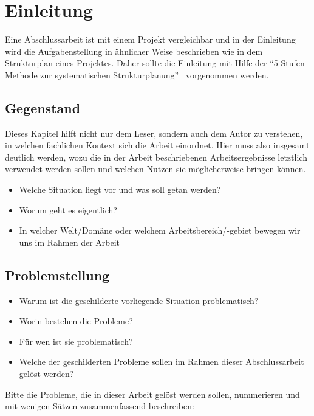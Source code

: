\chapter{Einleitung}\label{ch:introduction}
Eine Abschlussarbeit ist mit einem Projekt vergleichbar und in der Einleitung wird die Aufgabenstellung in ähnlicher Weise beschrieben wie in dem Strukturplan eines Projektes.
Daher sollte die Einleitung mit Hilfe der \enquote{5-Stufen-Methode zur systematischen Strukturplanung}~\citep{ob}\footnotemark{} vorgenommen werden.

\section{Gegenstand}
Dieses Kapitel hilft nicht nur dem Leser, sondern auch dem Autor zu verstehen, in welchen fachlichen Kontext sich die Arbeit einordnet.
Hier muss also insgesamt deutlich werden, wozu die in der Arbeit beschriebenen Arbeitsergebnisse letztlich verwendet werden sollen und welchen Nutzen sie möglicherweise bringen können.

\begin{itemize}
\item Welche Situation liegt vor und was soll getan werden?
\item Worum geht es eigentlich?
\item In welcher Welt/Domäne oder welchem Arbeitsbereich/-gebiet bewegen wir uns im Rahmen der Arbeit
\end{itemize}

\section{Problemstellung}
\begin{itemize}
\item Warum ist die geschilderte vorliegende Situation problematisch?
\item Worin bestehen die Probleme?
\item Für wen ist sie problematisch?
\item Welche der geschilderten Probleme sollen im Rahmen dieser Abschlussarbeit gelöst werden?
\end{itemize}

Bitte die Probleme, die in dieser Arbeit gelöst werden sollen, nummerieren und mit wenigen Sätzen zusammenfassend beschreiben:

